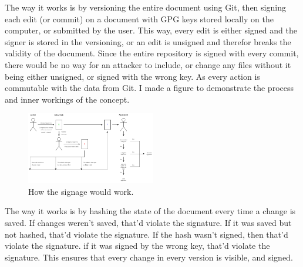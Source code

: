 \documentclass[conference]{IEEEtran}
\begin{document}
        The way it works is by versioning the entire document using Git\cite{git}, then signing each edit (or commit) on a document with GPG keys\cite{gnupg} stored locally on the computer, or submitted by the user. This way, every edit is either signed and the signer is stored in the versioning, or an edit is unsigned and therefor breaks the validity of the document. Since the entire repository is signed with every commit, there would be no way for an attacker to include, or change any files without it being either unsigned, or signed with the wrong key. As every action is commutable with the data from Git. I made a figure to demonstrate the process and inner workings of the concept.
        
        \begin{figure}[h]
          \centering
          \includegraphics[width=0.5\textwidth]{images/essay.png}
          \caption{How the signage would work.}
          \label{fig:example}
        \end{figure}
        
        The way it works is by hashing the state of the document every time a change is saved. If changes weren't saved, that'd violate the signature. If it was saved but not hashed, that'd violate the signature. If the hash wasn't signed, then that'd violate the signature. if it was signed by the wrong key, that'd violate the signature. This ensures that every change in every version is visible, and signed. 
    
        
\end{document}
